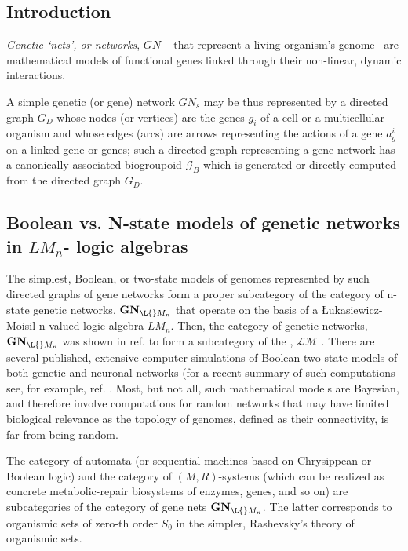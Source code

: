 \documentclass[12pt]{article}
\begin{document}
\subsection{Introduction}
 
 \emph{Genetic `nets', or networks}, $GN$ -- that represent a living organism's genome --are mathematical models of functional genes linked through their non-linear, dynamic interactions. 

 A simple genetic (or gene) network $GN_s$  may be thus represented by a directed graph $G_D$  whose nodes (or vertices) are the genes $g_i$ of a cell or a multicellular organism and whose edges (arcs) are arrows representing the actions of a gene $a_g^i$ on a linked gene or genes; such a directed graph representing a gene network has a canonically associated biogroupoid $\mathcal{G}_B$ which is generated or directly computed from the directed graph $G_D$. 

\subsection{Boolean vs. N-state models of genetic networks in $LM_n$- logic algebras}

 The simplest, Boolean, or two-state models of genomes represented by such directed graphs of gene networks form a proper subcategory of the category of n-state genetic networks, $\textbf{GN}_{\L{}M_n}$ that operate on the basis of a \L{}ukasiewicz-Moisil n-valued logic algebra $LM_n$. Then, the category of genetic networks,
$\textbf{GN}_{\L{}M_n}$ was shown in ref. \cite{ICBetal2k6} to form a subcategory of the 
, $\mathcal{LM}$ \cite{ICB77,ICBetal2k6}. There are several published, extensive computer simulations of Boolean two-state models of both genetic and neuronal networks (for a recent summary of such computations see, for example, ref. \cite{ICBetal2k6}. Most, but not all, such mathematical models are Bayesian, and therefore involve computations for random networks that may have limited biological relevance as the topology of genomes, defined as their connectivity, is far from being random.  


 The category of automata (or sequential machines based on Chrysippean or Boolean logic) and the category of $(M,R)$-systems (which can be realized as concrete metabolic-repair biosystems of enzymes, genes, and so on) are subcategories of the category of gene nets $\textbf{GN}_{\L{}M_n}$. The latter corresponds to organismic sets of zero-th order $S_0$ in the simpler, Rashevsky's theory of organismic sets.
 
\end{document}
